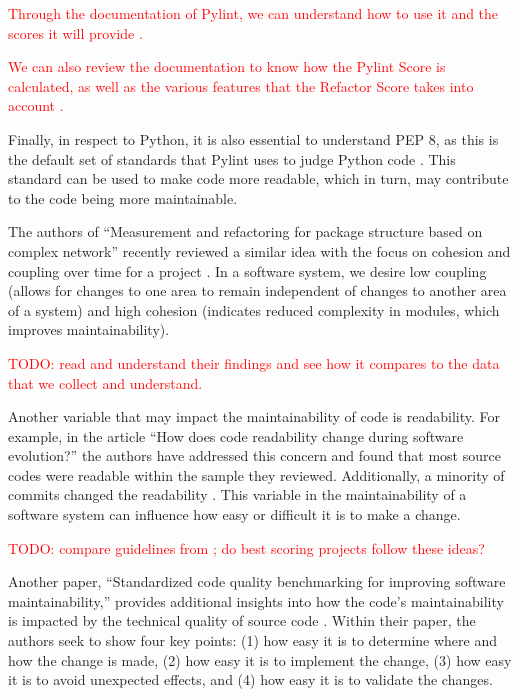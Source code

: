 \documentclass[12pt,conference]{IEEEtran}
\newcommand\todo[1]{\textcolor{red}{#1}}
\begin{document}
\todo{Through the documentation of Pylint, we can understand how to use it and the scores it will provide \cite{pylint:main}.}

\todo{We can also review the documentation to know how the Pylint Score is calculated, as well as the various features that the Refactor Score takes into account \cite{pylint:score}.}

Finally, in respect to Python, it is also essential to understand PEP 8, as this is the default set of standards that Pylint uses to judge Python code \cite{pylint:pep8}. This standard can be used to make code more readable, which in turn, may contribute to the code being more maintainable.


The authors of ``Measurement and refactoring for package structure based on complex network'' recently reviewed a similar idea with the focus on cohesion and coupling over time for a project \cite{zhou:2020}. In a software system, we desire low coupling (allows for changes to one area to remain independent of changes to another area of a system) and high cohesion (indicates reduced complexity in modules, which improves maintainability). 

\todo{TODO: read and understand their findings and see how it compares to the data that we collect and understand.}

Another variable that may impact the maintainability of code is readability. For example, in the article ``How does code readability change during software evolution?'' the authors have addressed this concern and found that most source codes were readable within the sample they reviewed. Additionally, a minority of commits changed the readability \cite{piantadosi:2020}. This variable in the maintainability of a software system can influence how easy or difficult it is to make a change. 

\todo{TODO: compare guidelines from \cite{piantadosi:2020}; do best scoring projects follow these ideas?}

Another paper, ``Standardized code quality benchmarking for improving software maintainability,'' provides additional insights into how the code's maintainability is impacted by the technical quality of source code \cite{baggen:2012}. Within their paper, the authors seek to show four key points: (1) how easy it is to determine where and how the change is made, (2) how easy it is to implement the change, (3) how easy it is to avoid unexpected effects, and (4) how easy it is to validate the changes. 
\end{document}
